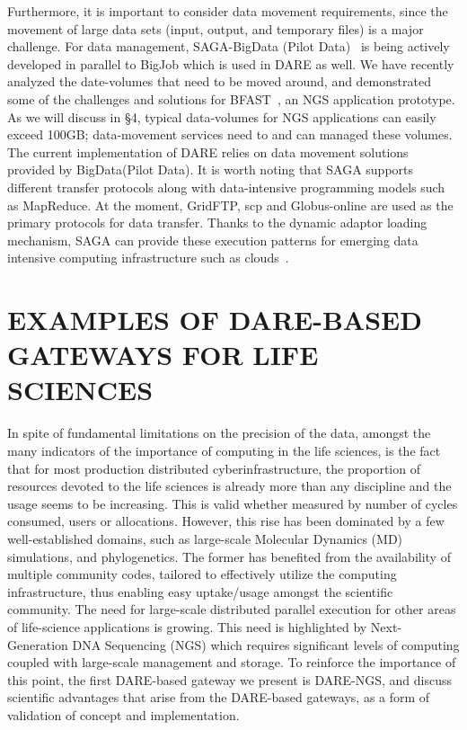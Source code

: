 \documentclass[]{svjour3}
\begin{document}
Furthermore, it is important to consider data movement requirements,
since the movement of large data sets (input, output, and temporary
files) is a major challenge.  For data management, SAGA-BigData (Pilot
Data)~\cite{pstar11} is being actively developed in parallel to BigJob
which is used in DARE as well.  We have recently analyzed the
date-volumes that need to be moved around, and demonstrated some of
the challenges and solutions for BFAST~\cite{dare-ecmls11}, an NGS
application prototype.  As we will discuss in \S4, typical
data-volumes for NGS applications can easily exceed 100GB;
data-movement services need to and can managed these volumes. The
current implementation of DARE relies on data movement solutions
provided by BigData(Pilot Data).  It is worth noting that SAGA
supports different transfer protocols along with data-intensive
programming models such as MapReduce.  At the moment, GridFTP, scp and
Globus-online are used as the primary protocols for data transfer.
Thanks to the dynamic adaptor loading mechanism, SAGA can provide
these execution patterns for emerging data intensive computing
infrastructure such as
clouds~\cite{bigjob_cloudcom10,saga_bigjob_condor_cloud}.




\section{EXAMPLES OF DARE-BASED GATEWAYS FOR LIFE SCIENCES}

In spite of fundamental limitations on the precision of the data,
amongst the many indicators of the importance of computing in the life
sciences, is the fact that for most production distributed
cyberinfrastructure, the proportion of resources devoted to the life
sciences is already more than any discipline and the usage seems to be
increasing. This is valid whether measured by number of cycles
consumed, users or allocations.  However, this rise has been dominated
by a few well-established domains, such as large-scale Molecular
Dynamics (MD) simulations, and phylogenetics.  The former has
benefited from the availability of multiple community codes, tailored
to effectively utilize the computing infrastructure, thus enabling
easy uptake/usage amongst the scientific community.  The need for
large-scale distributed parallel execution for other areas of
life-science applications is growing.  This need is highlighted by
Next-Generation DNA Sequencing (NGS) which requires significant levels
of computing coupled with large-scale management and storage.  To
reinforce the importance of this point, the first DARE-based gateway
we present is DARE-NGS, and discuss scientific advantages that arise
from the DARE-based gateways, as a form of validation of concept and
implementation.
\end{document}
